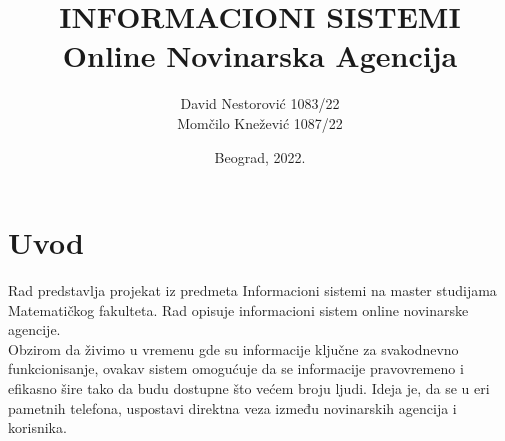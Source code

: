 \documentclass{article}
\title{INFORMACIONI SISTEMI\\Online Novinarska Agencija}
\author{
David Nestorović 1083/22\\
Momčilo Knežević 1087/22
}
\date{Beograd, 2022.}
\begin{document}
\maketitle

\newpage

\tableofcontents

\newpage

\section{Uvod}
\indent Rad predstavlja projekat iz predmeta Informacioni sistemi na master studijama Matematičkog 
fakulteta. Rad opisuje informacioni sistem online novinarske agencije. \\
\indent Obzirom da živimo u vremenu gde su informacije ključne za svakodnevno funkcionisanje, ovakav sistem omogućuje da se informacije pravovremeno i efikasno šire tako da budu dostupne što većem broju ljudi.  Ideja je, da se u eri pametnih telefona, uspostavi direktna veza između novinarskih agencija i korisnika.
\end{document}
